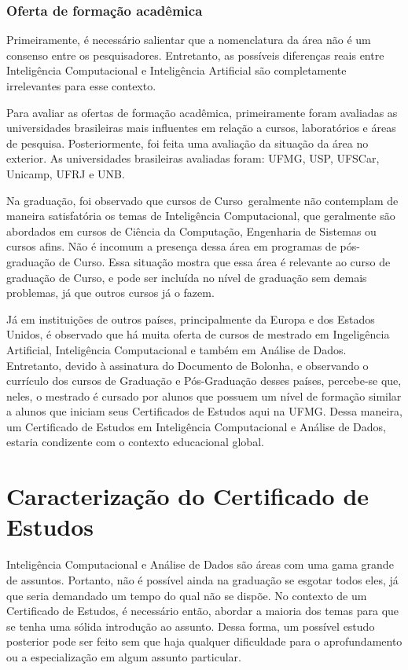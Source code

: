 \documentclass{article}
\newcommand{\curso}{Curso} %
\begin{document}
	\subsubsection{Oferta de formação acadêmica}
	Primeiramente, é necessário salientar que a nomenclatura da área não é um consenso entre os pesquisadores. Entretanto, as possíveis diferenças reais entre Inteligência Computacional e Inteligência Artificial são completamente irrelevantes para esse contexto. \par
	Para avaliar as ofertas de formação acadêmica, primeiramente foram avaliadas as universidades brasileiras mais influentes em relação a cursos, laboratórios e áreas de pesquisa. Posteriormente, foi feita uma avaliação da situação da área no exterior. As universidades brasileiras avaliadas foram: UFMG, USP, UFSCar, Unicamp, UFRJ e UNB. \par 
	Na graduação, foi observado que cursos de \curso \ geralmente não contemplam de maneira satisfatória os temas de Inteligência Computacional, que geralmente são abordados em cursos de Ciência da Computação, Engenharia de Sistemas ou cursos afins. Não é incomum a presença dessa área em programas de pós-graduação de \curso. Essa situação mostra que essa área é relevante ao curso de graduação de \curso, e pode ser incluída no nível de graduação sem demais problemas, já que outros cursos já o fazem. \par 
	Já em instituições de outros países, principalmente da Europa e dos Estados Unidos, é observado que há muita oferta de cursos de mestrado em Ingeligência Artificial, Inteligência Computacional e também em Análise de Dados. Entretanto, devido à assinatura do Documento de Bolonha, e observando o currículo dos cursos de Graduação e Pós-Graduação desses países, percebe-se que, neles, o mestrado é cursado por alunos que possuem um nível de formação similar a alunos que iniciam seus Certificados de Estudos aqui na UFMG. Dessa maneira, um Certificado de Estudos em Inteligência Computacional e Análise de Dados, estaria condizente com o contexto educacional global.
	
	\section{Caracterização do Certificado de Estudos} \label{sec:Carc}
	Inteligência Computacional e Análise de Dados são áreas com uma gama grande de assuntos. Portanto, não é possível ainda na graduação se esgotar todos eles, já que seria demandado um tempo do qual não se dispõe. No contexto de um Certificado de Estudos, é necessário então, abordar a maioria dos temas para que se tenha uma sólida introdução ao assunto. Dessa forma, um possível estudo posterior pode ser feito sem que haja qualquer dificuldade para o aprofundamento ou a especialização em algum assunto particular.
	
\end{document}
